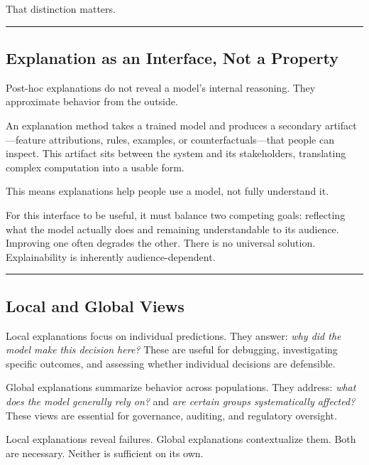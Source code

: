 \documentclass[
  letterpaper,
  DIV=11,
  numbers=noendperiod]{scrartcl}
\begin{document}
That distinction matters.

\begin{center}\rule{0.5\linewidth}{0.5pt}\end{center}

\subsection{Explanation as an Interface, Not a
Property}\label{explanation-as-an-interface-not-a-property}

Post-hoc explanations do not reveal a model's internal reasoning. They
approximate behavior from the outside.

An explanation method takes a trained model and produces a secondary
artifact---feature attributions, rules, examples, or
counterfactuals---that people can inspect. This artifact sits between
the system and its stakeholders, translating complex computation into a
usable form.

This means explanations help people use a model, not fully understand
it.

For this interface to be useful, it must balance two competing goals:
reflecting what the model actually does and remaining understandable to
its audience. Improving one often degrades the other. There is no
universal solution. Explainability is inherently audience-dependent.

\begin{center}\rule{0.5\linewidth}{0.5pt}\end{center}

\subsection{Local and Global Views}\label{local-and-global-views}

Local explanations focus on individual predictions. They answer:
\emph{why did the model make this decision here?} These are useful for
debugging, investigating specific outcomes, and assessing whether
individual decisions are defensible.

Global explanations summarize behavior across populations. They address:
\emph{what does the model generally rely on?} and \emph{are certain
groups systematically affected?} These views are essential for
governance, auditing, and regulatory oversight.

Local explanations reveal failures. Global explanations contextualize
them. Both are necessary. Neither is sufficient on its own.
\end{document}
